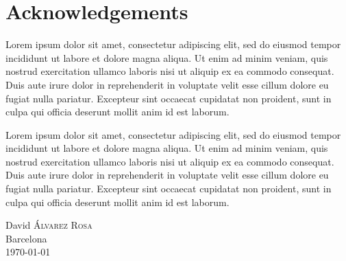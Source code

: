 \chapter*{Acknowledgements}

Lorem ipsum dolor sit amet, consectetur adipiscing elit, sed do eiusmod tempor
incididunt ut labore et dolore magna aliqua. Ut enim ad minim veniam, quis
nostrud exercitation ullamco laboris nisi ut aliquip ex ea commodo
consequat. Duis aute irure dolor in reprehenderit in voluptate velit esse
cillum dolore eu fugiat nulla pariatur. Excepteur sint occaecat cupidatat non
proident, sunt in culpa qui officia deserunt mollit anim id est laborum.

Lorem ipsum dolor sit amet, consectetur adipiscing elit, sed do eiusmod tempor
incididunt ut labore et dolore magna aliqua. Ut enim ad minim veniam, quis
nostrud exercitation ullamco laboris nisi ut aliquip ex ea commodo
consequat. Duis aute irure dolor in reprehenderit in voluptate velit esse
cillum dolore eu fugiat nulla pariatur. Excepteur sint occaecat cupidatat non
proident, sunt in culpa qui officia deserunt mollit anim id est laborum.

\begin{flushright}
  David \textsc{Álvarez Rosa} \\
  Barcelona \\
  \today
\end{flushright}

\vspace{2ex}
\begin{center}
\end{center}



\tableofcontents
\listoffigures
\listoftables
{}